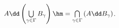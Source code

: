 \label{tri}
            $A\dd\left(\bigcup\limits_{\gamma\in\Gamma} B_\gamma\right)\hm=
            \bigcap\limits_{\gamma\in\Gamma} \left(A\dd B_\gamma\right)$.
        